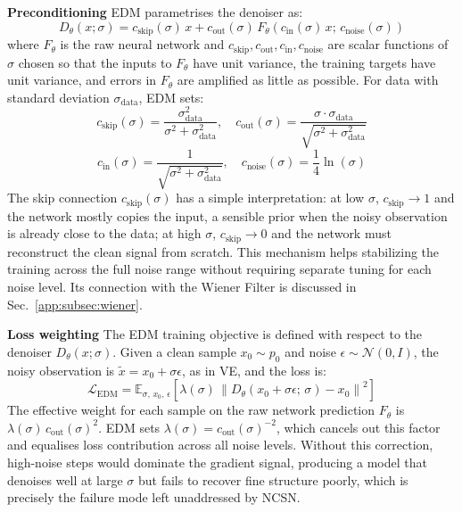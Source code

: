 \textbf{Preconditioning} \quad EDM parametrises the denoiser as:
\begin{equation}
    \label{eq:edm_denoiser}
    D_\theta(x;\sigma) = c_{\text{skip}}(\sigma)\,x + 
    c_{\text{out}}(\sigma)\,F_\theta\!\left(c_{\text{in}}(\sigma)\,x;\, 
    c_{\text{noise}}(\sigma)\right)
\end{equation}
where $F_\theta$ is the raw neural network and 
$c_{\text{skip}}, c_{\text{out}}, c_{\text{in}}, c_{\text{noise}}$ are scalar 
functions of $\sigma$ chosen so that the inputs to $F_\theta$ have unit variance, 
the training targets have unit variance, and errors in $F_\theta$ are amplified as 
little as possible. For data with standard deviation $\sigma_{\text{data}}$, 
EDM sets:
$$
c_{\text{skip}}(\sigma)= \frac{\sigma_{\text{data}}^2}{\sigma^2 + 
    \sigma_{\text{data}}^2}, \quad 
    c_{\text{out}}(\sigma)= \frac{\sigma \cdot \sigma_{\text{data}}}
    {\sqrt{\sigma^2 + \sigma_{\text{data}}^2}}
$$
$$
c_{\text{in}}(\sigma)=\frac{1}{\sqrt{\sigma^2 + 
    \sigma_{\text{data}}^2}}, \quad
    c_{\text{noise}}(\sigma)=\frac{1}{4}\ln(\sigma)
$$
The skip connection $c_{\text{skip}}(\sigma)$ has a simple interpretation: at low $\sigma$, $c_{\text{skip}} \to 1$ and the network mostly 
copies the input, a sensible prior when the noisy observation is already close to 
the data; at high $\sigma$, $c_{\text{skip}} \to 0$ and the network must 
reconstruct the clean signal from scratch. This mechanism helps stabilizing the training 
across the full noise range without requiring separate tuning for each noise level. Its connection with the Wiener Filter is discussed in Sec.\ \ref{app:subsec:wiener}. 

\textbf{Loss weighting} \quad The EDM training objective is defined with respect to the denoiser 
$D_\theta(x;\sigma)$. Given a clean sample $x_0 \sim p_0$ and noise 
$\epsilon \sim \mathcal{N}(0, I)$, the noisy observation is 
$\tilde{x} = x_0 + \sigma\epsilon$, as in VE, and the loss is:
\begin{equation}
    \label{eq:edm_loss}
    \mathcal{L}_{\text{EDM}} = \mathbb{E}_{\sigma,\, x_0,\, \epsilon}
    \left[\lambda(\sigma)\,\left\|D_\theta(x_0 + \sigma\epsilon;\,\sigma) - 
    x_0\right\|^2\right]
\end{equation}
The effective weight for each sample on the raw network prediction $F_\theta$ is 
$\lambda(\sigma)\,c_{\text{out}}(\sigma)^2$. EDM sets 
$\lambda(\sigma) = c_{\text{out}}(\sigma)^{-2}$, which cancels out this factor and equalises loss contribution across all noise levels. Without this correction, high-noise steps would dominate the gradient signal, producing a model that denoises well at large $\sigma$ but fails to recover fine 
structure poorly, which is precisely the failure mode left unaddressed by NCSN. 

